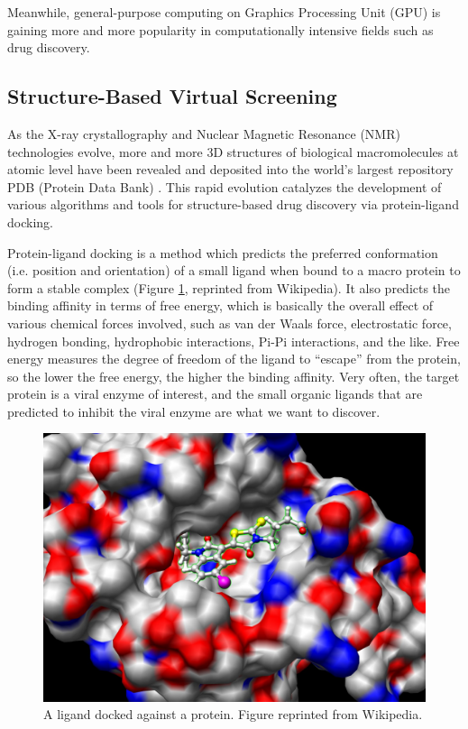 Meanwhile, general-purpose computing on Graphics Processing Unit (GPU) is gaining more and more popularity in computationally intensive fields such as drug discovery.

\subsection{Structure-Based Virtual Screening}

As the X-ray crystallography and Nuclear Magnetic Resonance (NMR) technologies evolve, more and more 3D structures of biological macromolecules at atomic level have been revealed and deposited into the world's largest repository PDB (Protein Data Bank) \citep{540,539,537,105,538}. This rapid evolution catalyzes the development of various algorithms and tools for structure-based drug discovery via protein-ligand docking.

Protein-ligand docking is a method which predicts the preferred conformation (i.e. position and orientation) of a small ligand when bound to a macro protein to form a stable complex (Figure \ref{fig:Docking}, reprinted from Wikipedia). It also predicts the binding affinity in terms of free energy, which is basically the overall effect of various chemical forces involved, such as van der Waals force, electrostatic force, hydrogen bonding, hydrophobic interactions, Pi-Pi interactions, and the like. Free energy measures the degree of freedom of the ligand to ``escape'' from the protein, so the lower the free energy, the higher the binding affinity. Very often, the target protein is a viral enzyme of interest, and the small organic ligands that are predicted to inhibit the viral enzyme are what we want to discover.

\begin{figure}[t]
\centering
\includegraphics[width=\textwidth]{Figures/Docking.jpg}
\caption{A ligand docked against a protein. Figure reprinted from Wikipedia.}
\label{fig:Docking}
\end{figure}

